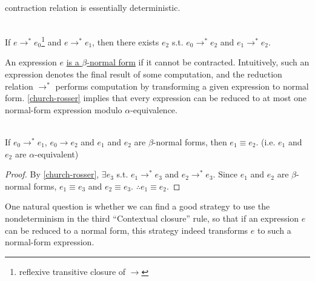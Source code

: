 \begin{enumcirc}
	contraction relation is essentially deterministic.
	\begin{property}
		\label{church-rosser}
		\ \\
		If $e \rightarrow^* e_0$\footnote{ reflexive transitive closure of
			$\rightarrow$ } and $e \rightarrow^* e_1$, then there exists $e_2$ s.t. $e_0
			\rightarrow^* e_2$ and $e_1 \rightarrow^* e_2$.
	\end{property}
	\item
	An expression $e$ \ul{is a $\beta$-normal form} if it cannot be contracted.
	Intuitively, such an expression denotes the final result of some computation,
	and the reduction relation $\rightarrow^*$ performs computation by transforming
	a given expression to normal form.
	\cref{church-rosser} implies that every expression can be reduced to at most
	one normal-form expression modulo $\alpha$-equivalence.
	\begin{property}
		\ \\
		If $e_0 \rightarrow^* e_1$, $e_0 \rightarrow e_2$ and $e_1$ and $e_2$ are
		$\beta$-normal forms, then $e_1 \equiv e_2$. (i.e. $e_1$ and $e_2$ are
		$\alpha$-equivalent)
	\end{property}
	\begin{proof}
		By \cref{church-rosser}, $\exists e_3$ s.t.
		$e_1 \rightarrow^* e_3$ and $e_2 \rightarrow^* e_3$.
		Since $e_1$ and $e_2$ are $\beta$-normal forms,
		$e_1 \equiv e_3$ and $e_2 \equiv e_3$.
		$\therefore e_1 \equiv e_2$.
	\end{proof}
	\item
	One natural question is whether we can find a good strategy to use the
	nondeterminism in the third ``Contextual closure'' rule, so that if an
	expression $e$ can be reduced to a normal form, this strategy indeed transforms
	$e$ to such a normal-form expression.


\end{enumcirc}
